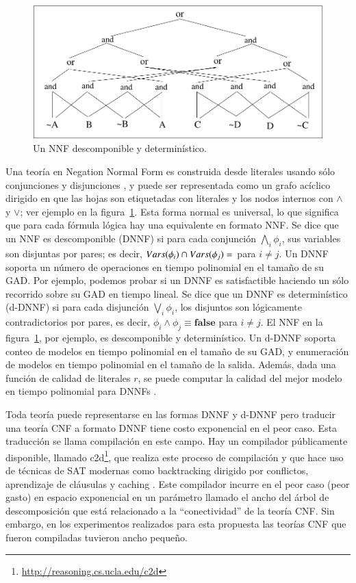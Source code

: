 \begin{figure}[t]
\centering
\includegraphics[width=.7\textwidth]{graphics/odd}
\caption{Un NNF descomponible y determinístico.}
\label{fig:dnnf}
\end{figure}

Una teoría en Negation Normal Form es construida desde literales usando sólo
conjunciones y disjunciones \cite{barwise:handbook}, y puede ser representada como un grafo
acíclico dirigido en que las hojas son etiquetadas con literales y los nodos
internos con $\land$ y $\lor$; ver ejemplo en la figura~\ref{fig:dnnf}. Esta
forma normal es universal, lo que significa que para cada fórmula lógica hay una
equivalente en formato NNF. Se dice que un NNF es descomponible (DNNF)
\cite{darwiche:d-dnnfs}
si para cada conjunción $\bigwedge_i\phi_i$, sus variables son disjuntas por pares; es
decir, $Vars(\phi_i)\cap Vars(\phi_j)=\empty$ para $i\neq j$. Un DNNF soporta un
número de operaciones en tiempo polinomial en el tamaño de su GAD. Por ejemplo,
podemos probar si un DNNF es satisfactible haciendo un sólo recorrido 
sobre su GAD en tiempo lineal. Se dice que un DNNF es
determinístico (d-DNNF) \cite{darwiche:d-dnnfs} si para cada disjunción $\bigvee_i\phi_i$, los
disjuntos son lógicamente contradictorios por pares, es decir,
$\phi_i\land\phi_j\equiv\textbf{false}$ para $i\neq j$.
El NNF en la figura~\ref{fig:dnnf}, por ejemplo, es
descomponible y determinístico. Un d-DNNF soporta conteo de modelos en
tiempo polinomial en el tamaño de su GAD, y enumeración de modelos en tiempo
polinomial en el tamaño de la salida. Además, dada una función de calidad de
literales $r$, se puede computar la calidad del mejor modelo en tiempo
polinomial para DNNFs \cite{darwiche:weighted}.

Toda teoría puede representarse en las formas DNNF y d-DNNF pero traducir una teoría CNF a
formato DNNF tiene costo exponencial en el peor caso. Esta traducción se
llama compilación en este campo. Hay un compilador públicamente disponible,
llamado c2d\footnote{\url{http://reasoning.cs.ucla.edu/c2d}}, que realiza este proceso de compilación y que hace uso
de técnicas de SAT modernas como backtracking dirigido por conflictos,
aprendizaje de cláusulas y caching \cite{darwiche:compiler}. Este compilador incurre en el peor
caso (peor gasto) en espacio exponencial en un parámetro llamado el ancho del árbol de
descomposición que está relacionado a la ``conectividad'' de la teoría CNF.
Sin embargo, en los experimentos realizados para esta propuesta las teorías CNF
que fueron compiladas tuvieron ancho pequeño.


